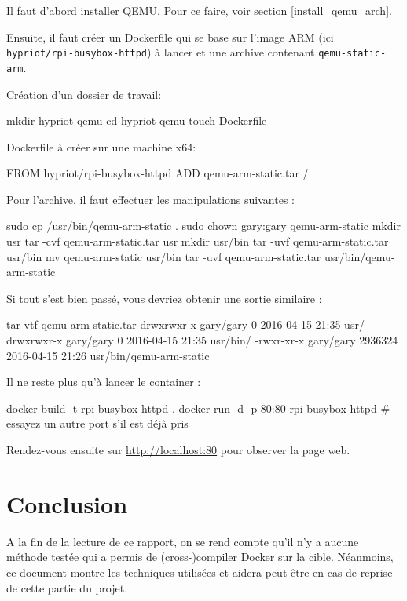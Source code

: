 \documentclass[11pt,a4paper,oneside]{report}
\newcommand{\code}[1]{\texttt{#1}} %
\begin{document}
Il faut d'abord installer QEMU. Pour ce faire, voir section \ref{install_qemu_arch}.

Ensuite, il faut créer un Dockerfile qui se base sur l'image ARM (ici \code{hypriot/rpi-busybox-httpd}) à lancer et une archive contenant \code{qemu-static-arm}.

Création d'un dossier de travail:

\begin{bashcode}
mkdir hypriot-qemu
cd hypriot-qemu
touch Dockerfile
\end{bashcode}

Dockerfile à créer sur une machine x64:

\begin{bashcode}
FROM hypriot/rpi-busybox-httpd
ADD qemu-arm-static.tar /
\end{bashcode}

Pour l'archive, il faut effectuer les manipulations suivantes :

\begin{bashcode}
sudo cp /usr/bin/qemu-arm-static .
sudo chown gary:gary qemu-arm-static
mkdir usr
tar -cvf qemu-arm-static.tar usr
mkdir usr/bin
tar -uvf qemu-arm-static.tar usr/bin
mv qemu-arm-static usr/bin
tar -uvf qemu-arm-static.tar usr/bin/qemu-arm-static
\end{bashcode}

Si tout s'est bien passé, vous devriez obtenir une sortie similaire :

\begin{bashcode}
tar vtf qemu-arm-static.tar
drwxrwxr-x gary/gary         0 2016-04-15 21:35 usr/
drwxrwxr-x gary/gary         0 2016-04-15 21:35 usr/bin/
-rwxr-xr-x gary/gary   2936324 2016-04-15 21:26 usr/bin/qemu-arm-static
\end{bashcode}

Il ne reste plus qu'à lancer le container :

\begin{bashcode}
docker build -t rpi-busybox-httpd .
docker run -d -p 80:80 rpi-busybox-httpd # essayez un autre port s'il est déjà pris
\end{bashcode}

Rendez-vous ensuite sur \url{http://localhost:80} pour observer la page web.

\chapter{Conclusion}
A la fin de la lecture de ce rapport, on se rend compte qu'il n'y a aucune méthode testée qui a permis de (cross-)compiler Docker sur la cible. Néanmoins, ce document montre les techniques utilisées et aidera peut-être en cas de reprise de cette partie du projet.
\end{document}
